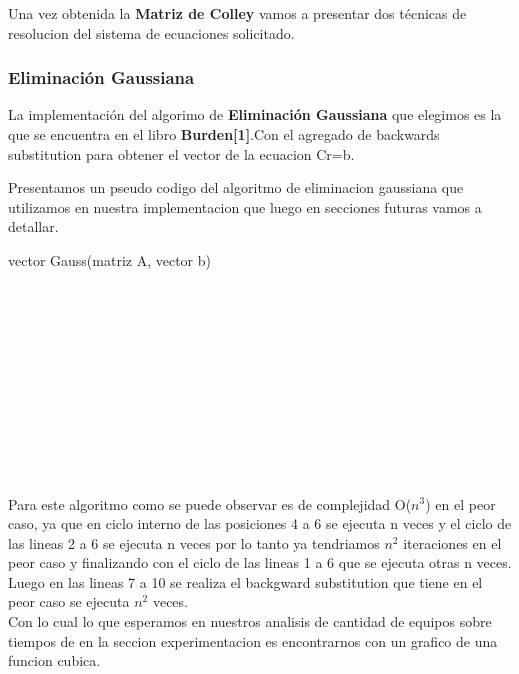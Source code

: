 Una vez obtenida la \textbf{Matriz de Colley} vamos a  presentar dos técnicas de resolucion del sistema de ecuaciones solicitado.\\

\subsubsection{Eliminación Gaussiana}
La implementación del algorimo de \textbf{Eliminación Gaussiana} que elegimos es la que se encuentra en el libro \textbf{Burden[1]}.Con el agregado de backwards substitution para 
obtener el vector de la ecuacion Cr=b.

Presentamos un pseudo codigo del algoritmo de eliminacion gaussiana que utilizamos en nuestra implementacion que luego en secciones futuras vamos a detallar.

\begin{algorithm}
    \begin{algorithmic}[1]\parskip=2mm
        \caption{vector Gauss(matriz A, vector b)}
        \\
        \\
        \\
        \\
        \\
        \\
        \\
        \\
        \\
        \\
    \end{algorithmic}
\end{algorithm}

Para este algoritmo como se puede observar es de complejidad O($n^3$) en el peor caso, ya que en ciclo interno de las posiciones 4 a 6 se ejecuta n veces
y el ciclo de las lineas 2 a 6 se ejecuta n veces por lo tanto ya tendriamos $n^2$ iteraciones en el peor caso y finalizando con el ciclo de las lineas 1 a 6 que se ejecuta otras n veces.
Luego en las lineas 7 a 10 se realiza el backgward substitution  que tiene en el peor caso se ejecuta $n^2$ veces.\\
Con lo cual lo que esperamos en nuestros analisis de cantidad de equipos sobre tiempos de en la seccion experimentacion es encontrarnos con un grafico de una funcion cubica.

